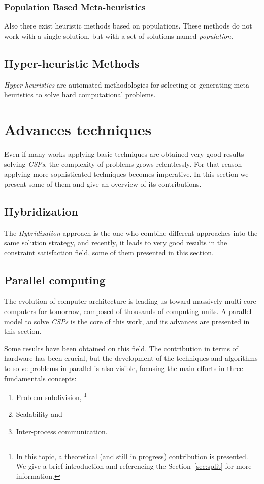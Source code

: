 \documentclass[a4paper]{book} %
\newcommand{\csp}{\textit{CSP}}
\newcommand{\csps}{\csp\textit{s}}
\begin{document}
\subsubsection{Population Based Meta-heuristics}

Also there exist heuristic methods based on populations. These methods do not work with a single solution, but with a set of solutions named {\it population}. 

\subsection{Hyper-heuristic Methods}

\textit{Hyper-heuristics} are automated methodologies for selecting or generating meta-heuristics to solve hard computational problems.

\section{Advances techniques}

Even if many works applying basic techniques are obtained very good results solving \csps{}, the complexity of problems grows relentlessly. For that reason applying more sophisticated techniques becomes imperative. In this section we present some of them and give an overview of its contributions. 

\subsection{Hybridization}

The \textit{Hybridization} approach is the one who combine different approaches into the same solution strategy, and recently, it leads to very good results in the constraint satisfaction field, some of them presented in this section.

\subsection{Parallel computing}

The evolution of computer architecture is leading us toward massively multi-core computers for tomorrow, composed of thousands of computing units. A parallel model to solve \csps{} is the core of this work, and its advances are presented in this section.

Some results have been obtained on this field. The contribution in terms of hardware has been crucial, but the development of the techniques and algorithms to solve problems in parallel is
also visible, focusing the main efforts in three fundamentals concepts:
\begin{enumerate}
\item Problem subdivision, \footnote{In this topic, a theoretical (and still in progress) contribution is presented. We give a brief introduction and referencing the Section~\ref{sec:split} for more information.}
\item Scalability and
\item Inter-process communication.
\end{enumerate}
\end{document}
